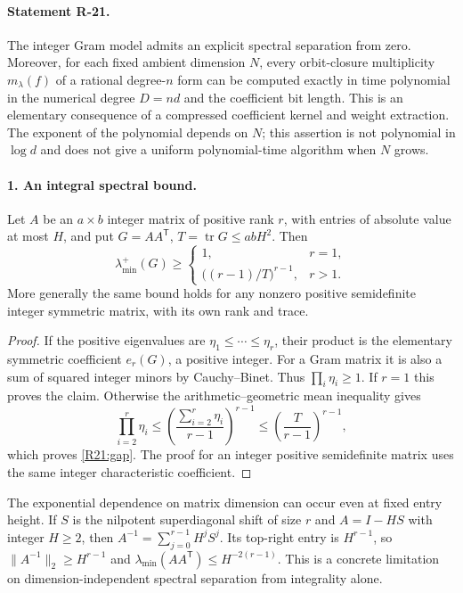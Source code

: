 \paragraph{Statement R-21.}
The integer Gram model admits an explicit spectral separation from
zero. Moreover, for each fixed ambient dimension $N$, every orbit-closure
multiplicity $m_\lambda(f)$ of a rational degree-$n$ form can be computed
exactly in time polynomial in the numerical degree $D=nd$ and the
coefficient bit length. This is an elementary consequence of a compressed
coefficient kernel and weight extraction. The exponent of the polynomial
depends on $N$; this assertion is not polynomial in $\log d$ and does not
give a uniform polynomial-time algorithm when $N$ grows.

\paragraph{1. An integral spectral bound.}
Let $A$ be an $a\times b$ integer matrix of positive rank $r$, with
entries of absolute value at most $H$, and put $G=AA^{\mathsf T}$,
$T=\operatorname{tr}G\leq abH^2$. Then
\begin{equation}\label{R21:gap}
 \lambda_{\min}^{+}(G)\geq
 \begin{cases}
 1,&r=1,\\[1mm]
 \bigl((r-1)/T\bigr)^{r-1},&r>1.
 \end{cases}
\end{equation}
More generally the same bound holds for any nonzero positive semidefinite
integer symmetric matrix, with its own rank and trace.

\begin{proof}
If the positive eigenvalues are $\eta_1\leq\cdots\leq\eta_r$, their
product is the elementary symmetric coefficient $e_r(G)$, a positive
integer. For a Gram matrix it is also a sum of squared integer minors
by Cauchy--Binet. Thus $\prod_i\eta_i\geq1$.
If $r=1$ this proves the claim. Otherwise the arithmetic--geometric
mean inequality gives
\[
 \prod_{i=2}^r\eta_i\leq
 \left(\frac{\sum_{i=2}^r\eta_i}{r-1}\right)^{r-1}
 \leq\left(\frac{T}{r-1}\right)^{r-1},
\]
which proves \eqref{R21:gap}. The proof for an integer positive
semidefinite matrix uses the same integer characteristic coefficient.
\end{proof}

The exponential dependence on matrix dimension can occur even at fixed
entry height. If $S$ is the nilpotent superdiagonal shift of size $r$
and $A=I-HS$ with integer $H\geq2$, then
$A^{-1}=\sum_{j=0}^{r-1}H^jS^j$. Its top-right entry is $H^{r-1}$,
so $\|A^{-1}\|_2\geq H^{r-1}$ and
$\lambda_{\min}(AA^{\mathsf T})\leq H^{-2(r-1)}$.
This is a concrete limitation on dimension-independent spectral
separation from integrality alone.

